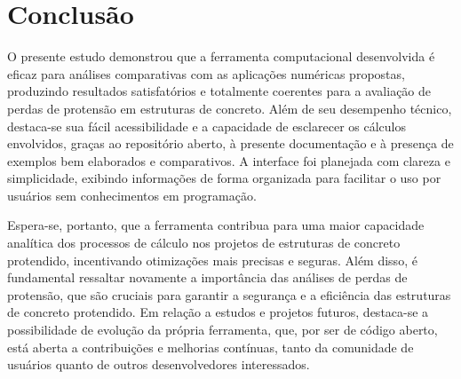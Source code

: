 \section{Conclusão}

\hspace{0.4cm}O presente estudo demonstrou que a ferramenta computacional desenvolvida é eficaz para análises comparativas com as aplicações numéricas propostas, produzindo resultados satisfatórios e totalmente coerentes para a avaliação de perdas de protensão em estruturas de concreto. Além de seu desempenho técnico, destaca-se sua fácil acessibilidade e a capacidade de esclarecer os cálculos envolvidos, graças ao repositório aberto, à presente documentação e à presença de exemplos bem elaborados e comparativos. A interface foi planejada com clareza e simplicidade, exibindo informações de forma organizada para facilitar o uso por usuários sem conhecimentos em programação.

Espera-se, portanto, que a ferramenta contribua para uma maior capacidade analítica dos processos de cálculo nos projetos de estruturas de concreto protendido, incentivando otimizações mais precisas e seguras. Além disso, é fundamental ressaltar novamente a importância das análises de perdas de protensão, que são cruciais para garantir a segurança e a eficiência das estruturas de concreto protendido. Em relação a estudos e projetos futuros, destaca-se a possibilidade de evolução da própria ferramenta, que, por ser de código aberto, está aberta a contribuições e melhorias contínuas, tanto da comunidade de usuários quanto de outros desenvolvedores interessados.